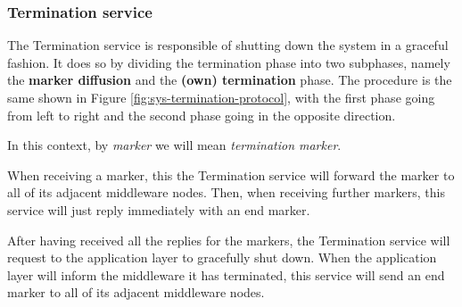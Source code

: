 \subsubsection{Termination service}\label{sec:mw-termination-descr}

The Termination service is responsible of shutting down the system in a
graceful fashion.
It does so by dividing the termination phase into two subphases, namely the
\textbf{marker diffusion} and the \textbf{(own) termination} phase. The
procedure is the same shown in Figure \ref{fig:sys-termination-protocol}, with
the first phase going from left to right and the second phase going in the
opposite direction.

In this context, by \textit{marker} we will mean \textit{termination marker}.

When receiving a marker, this the Termination service will forward the marker
to all of its adjacent middleware nodes.
Then, when receiving further markers, this service will just reply immediately
with an end marker.

After having received all the replies for the markers, the Termination service
will request to the application layer to gracefully shut down.
When the application layer will inform the middleware it has terminated, this
service will send an end marker to all of its adjacent middleware nodes.
